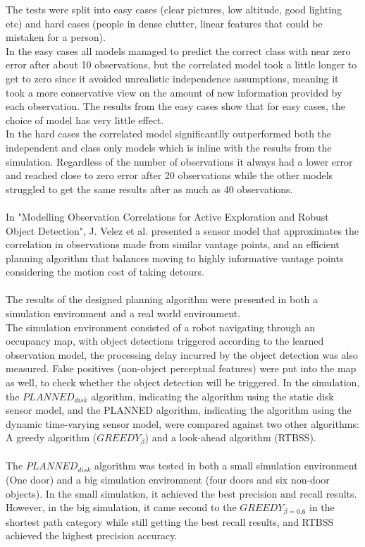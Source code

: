 \documentclass{article}
\begin{document}
	The tests were split into easy cases (clear pictures, low altitude, good lighting etc) and hard cases (people in dense clutter, linear features that could be mistaken for a person).\\
	In the easy cases all models managed to predict the correct class with near zero error after about 10 observations, but the correlated model took a little longer to get to zero since it avoided unrealistic independence assumptions, meaning it took a more conservative view on the amount of new information provided by each observation. The results from the easy cases show that for easy cases, the choice of model has very little effect. \\
	In the hard cases the correlated model significantlly outperformed both the independent and class only models which is inline with the results from the simulation. Regardless of the number of observations it always had a lower error and reached close to zero error after 20 observations while the other models struggled to get the same results after as much as 40 observations. \\ \\
	In "Modelling Observation Correlations for Active Exploration and Robust Object Detection", J. Velez et al. presented a sensor model that approximates the correlation in observations made from similar vantage points, and an efficient planning algorithm that balances moving to highly informative vantage points considering the motion cost of taking detours. \\ \\
	The results of the designed planning algorithm were presented in both a simulation environment and a real world environment. \\
	The simulation environment consisted of a robot navigating through an occupancy map, with object detections triggered according to the learned observation model, the processing delay incurred by the object detection was also measured. False positives (non-object perceptual features) were put into the map as well, to check whether the object detection will be triggered.
	In the simulation, the $PLANNED_{disk}$ algorithm, indicating the algorithm using the static disk sensor model, and the PLANNED algorithm, indicating the algorithm using the dynamic time-varying sensor model, were compared against two other algorithms: A greedy algorithm ($GREEDY_{\beta}$) and a look-ahead algorithm (RTBSS). \\ \\
	The $PLANNED_{disk}$ algorithm was tested in both a small simulation environment (One door) and a big simulation environment (four doors and six non-door objects). In the small simulation, it achieved the best precision and recall results. However, in the big simulation, it came second to the $GREEDY_{\beta=0.6}$ in the shortest path category while still getting the best recall results, and RTBSS achieved the highest precision accuracy.\\ \\
\end{document}
